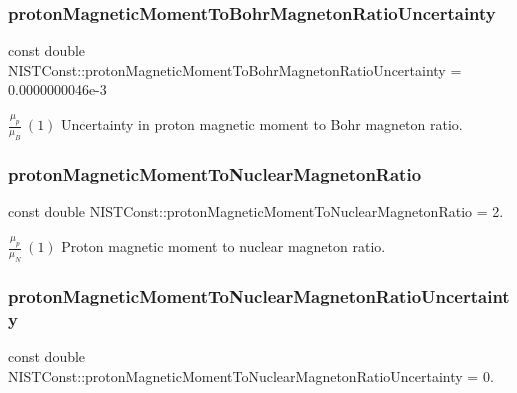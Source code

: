 \subsubsection{\texorpdfstring{proton\+Magnetic\+Moment\+To\+Bohr\+Magneton\+Ratio\+Uncertainty}{protonMagneticMomentToBohrMagnetonRatioUncertainty}}
{\footnotesize\ttfamily const double N\+I\+S\+T\+Const\+::proton\+Magnetic\+Moment\+To\+Bohr\+Magneton\+Ratio\+Uncertainty = 0.\+0000000046e-\/3}

$\frac{\mu_p}{\mu_B} \ (1)$ Uncertainty in proton magnetic moment to Bohr magneton ratio. \mbox{\label{group___n_i_s_t_const-_proton_gae8cd4187eb7069a37639787bf4b1305a}} 
\subsubsection{\texorpdfstring{proton\+Magnetic\+Moment\+To\+Nuclear\+Magneton\+Ratio}{protonMagneticMomentToNuclearMagnetonRatio}}
{\footnotesize\ttfamily const double N\+I\+S\+T\+Const\+::proton\+Magnetic\+Moment\+To\+Nuclear\+Magneton\+Ratio = 2.}

$\frac{\mu_p}{\mu_N} \ (1)$ Proton magnetic moment to nuclear magneton ratio. \mbox{\label{group___n_i_s_t_const-_proton_gaa4c8406d5e6355f61b1c78ad5f85cda1}} 
\subsubsection{\texorpdfstring{proton\+Magnetic\+Moment\+To\+Nuclear\+Magneton\+Ratio\+Uncertainty}{protonMagneticMomentToNuclearMagnetonRatioUncertainty}}
{\footnotesize\ttfamily const double N\+I\+S\+T\+Const\+::proton\+Magnetic\+Moment\+To\+Nuclear\+Magneton\+Ratio\+Uncertainty = 0.}


